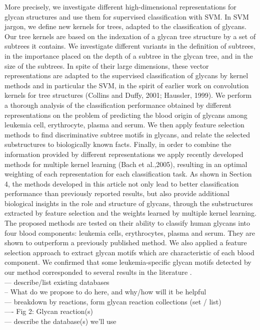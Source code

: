 \documentclass[12pt,a4paper]{article}
\begin{document}
More precisely, we investigate different high-dimensional representations for glycan structures and use them for supervised classification with SVM. In SVM jargon, we define new kernels for trees, adapted to the classification of glycans. Our tree kernels are based on the indexation of a glycan tree structure by a set of subtrees it contains. We investigate different variants in the definition of subtrees, in the importance placed on the depth of a subtree in the glycan tree, and in the size of the subtrees. In spite of their large dimensions, these vector representations are adapted to the supervised classification of glycans by kernel methods and in particular the SVM, in the spirit of earlier work on convolution kernels for tree structures (Collins and Duffy, 2001; Haussler, 1999). We perform a thorough analysis of the classification performance obtained by different representations on the problem of predicting the blood origin of glycans among leukemia cell, erythrocyte, plasma and serum. We then apply feature selection methods to find discriminative subtree motifs in glycans, and relate the selected substructures to biologically known facts. Finally, in order to combine the information provided by different representations we apply recently developed methods for multiple kernel learning (Bach et al.,2005), resulting in an optimal weighting of each representation for each classification task. As shown in Section 4, the methods developed in this article not only lead to better classification performance than previously reported results, but also provide additional biological insights in the role and structure of glycans, through the substructures extracted by feature selection and the weights learned by multiple kernel learning. The proposed methods are tested on their ability to classify human glycans into four blood components: leukemia cells, erythrocytes, plasma and serum. They are shown to outperform a previously published method. We also applied a feature selection approach to extract glycan motifs which are characteristic of each blood component. We confirmed that some leukemia-specific glycan motifs detected by our method corresponded to several results in the literature \citep{doi:10.1093/bioinformatics/btm090}.\\

--- describe/list existing databases\\


-- What do we propose to do here, and why/how will it be helpful\\
--- breakdown by reactions, form glycan reaction collections (set / list)\\
---- Fig 2: Glycan reaction(s)\\
--- describe the database(s) we'll use\\
\end{document}
